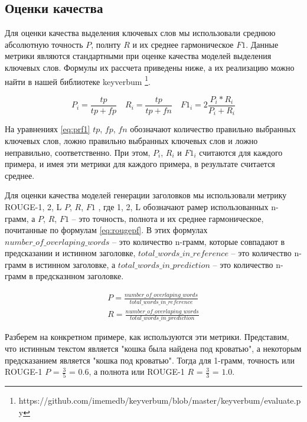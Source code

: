 \documentclass[14pt]{matmex-diploma-custom}
\begin{document}
\subsection{Оценки качества}
Для оценки качества выделения ключевых слов мы использовали среднюю абсолютную точность $P$, полнту $R$ и их среднее гармоническое $F1$.
Данные метрики являются стандартными при оценке качества моделей выделения ключевых слов.
Формулы их рассчета приведены ниже, а их реализацию можно найти в нашей библиотеке keyverbum \footnote{https://github.com/imemedb/keyverbum/blob/master/keyverbum/evaluate.py}.

\begin{equation}\label{eq:prf1}
    P_{i} = \frac{tp}{tp + fp} \quad R_{i} = \frac{tp}{tp + fn} \quad F1_{i}=2\frac{P_{i}*R_{i}}{P_{i}+R_{i}}
\end{equation}

На уравнениях \ref{eq:prf1} $tp$, $fp$, $fn$ обозначают количество правильно выбранных ключевых слов, ложно правильно выбранных ключевых слов и ложно неправильно, соответственно.
При этом, $P_i$, $R_i$ и $F1_i$ считаются для каждого примера, и имея эти метрики для каждого примера, в результате считается среднее.

Для оценки качества моделей генерации заголовков мы использовали метрику ROUGE-1, 2, L $P$, $R$, $F1$ \cite{Lin:2004}, где 1, 2, L обозначают рамер использованных
n-грамм, а $P$, $R$, $F1$ -- это точность, полнота и их среднее гармоническое, почитанные по формулам \ref{eq:rougepf}. В этих формулах $number\_of\_overlaping\_words$ -- это количество n-грамм, которые совпадают в предсказании и истинном заголовке, $total\_words\_in\_reference$ -- это количество n-грамм в истинном заголовке, а $total\_words\_in\_prediction$ -- это количество n-грамм в предсказнном заголовке.

\begin{equation}\label{eq:rougepf}
\begin{gathered}
P = \frac{number\_of\_overlaping\_words}{total\_words\_in\_reference} \\ 
R = \frac{number\_of\_overlaping\_words}{total\_words\_in\_prediction}
\end{gathered}
\end{equation}

Разберем на конкретном примере, как используются эти метрики. Представим, что истинным текстом является "кошка была найдена под кроватью", а некоторым предсказанием является "кошка под кроватью".
Тогда для 1-грамм, точность или ROUGE-1 $P$ = $\frac{3}{5}$ = $0.6$, а полнота или ROUGE-1 $R$ = $\frac{3}{3}$ = $1.0$.
\end{document}
